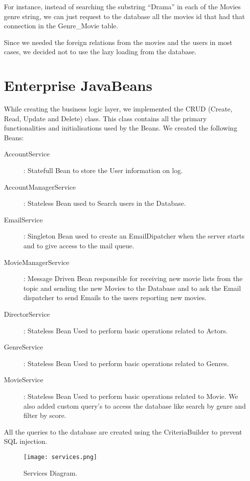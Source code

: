 \documentclass[12pt]{article}
\begin{document}
For instance, instead of searching the substring ``Drama'' in each of the Movies genre string, we can just request to the database all the movies id that had that connection in the Genre\_Movie table.

Since we needed the foreign relations from the movies and the users in most cases, we decided not to use the lazy loading from the database.
\clearpage

\section{Enterprise JavaBeans}
\indent \indent While creating the business logic layer, we implemented the CRUD (Create, Read, Update and Delete) class. This class contains all the primary functionalities and initialisations used by the Beans.
We created the following Beans:
\begin{description}
	\item [AccountService]: Statefull Bean to store the User information on log.

	\item [AccountManagerService]: Stateless Bean used to Search users in the Database.

	\item [EmailService]: Singleton Bean used to create an EmailDipatcher when the server starts and to give access to the mail queue.

	\item [MovieManagerService]: Message Driven Bean responsible for receiving new movie lists from the topic and sending the new Movies to the Database and to ask the Email dispatcher to send Emails to the users reporting new movies.

	\item [DirectorService]: Stateless Bean Used to perform basic operations related to Actors.

	\item [GenreService]: Stateless Bean Used to perform basic operations related to Genres.

	\item [MovieService]: Stateless Bean Used to perform basic operations related to Movie. We also added custom query’s to access the database like search by genre and filter by score.
\end{description}
All the queries to the database are created using the CriteriaBuilder to prevent SQL injection.

\begin{figure}[h!]
	\centering
	\texttt{[image: services.png]}
	\caption{Services Diagram.}
\end{figure}
\end{document}
